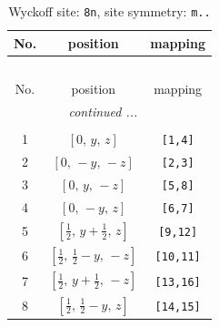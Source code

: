 \documentclass[fleqn,8pt]{jsarticle}
\begin{document}
\begin{longtable}{ccc}
\caption{Wyckoff site: {\tt 8n}, site symmetry: {\tt m..}}
 \\
 \hline \hline
No. & position & mapping \\ \hline \endfirsthead

\multicolumn{2}{l}{\tablename\ \thetable{}} \\
 \hline \hline
No. & position & mapping \\ \hline \endhead

 \hline \hline
\multicolumn{2}{r}{\footnotesize\it continued ...} \\ \endfoot

 \hline \hline
\multicolumn{2}{r}{} \\ \endlastfoot

1 & $\left[ 0,\, y,\, z \right]$ & {\tt [1,4]} \\ \hline
2 & $\left[ 0,\, - y,\, - z \right]$ & {\tt [2,3]} \\ \hline
3 & $\left[ 0,\, y,\, - z \right]$ & {\tt [5,8]} \\ \hline
4 & $\left[ 0,\, - y,\, z \right]$ & {\tt [6,7]} \\ \hline
5 & $\left[ \frac{1}{2},\, y + \frac{1}{2},\, z \right]$ & {\tt [9,12]} \\ \hline
6 & $\left[ \frac{1}{2},\, \frac{1}{2} - y,\, - z \right]$ & {\tt [10,11]} \\ \hline
7 & $\left[ \frac{1}{2},\, y + \frac{1}{2},\, - z \right]$ & {\tt [13,16]} \\ \hline
8 & $\left[ \frac{1}{2},\, \frac{1}{2} - y,\, z \right]$ & {\tt [14,15]} \\
\end{longtable}
\renewcommand{\arraystretch}{1.2}
\end{document}
